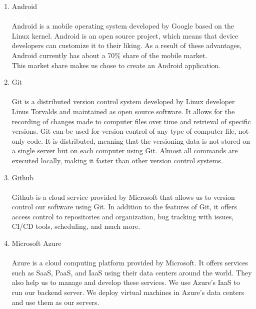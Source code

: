\begin{enumerate}[label=\arabic*]
\begin{enumerate}[label=\alph*.]
              \item Android\\
                    \\
                    Android is a mobile operating system developed by Google based on the Linux kernel. Android is an open source project, which means that device developers can customize it to their liking. As a result of these advantages, Android currently has about a 70\% share of the mobile market.
                    \cite{StatCounter}
                    \\
                    This market share makes us chose to create an Android application.\\

              \item Git\\
                    \\
                    Git is a distributed version control system developed by Linux developer Linus Torvalds and maintained as open source software. It allows for the recording of changes made to computer files over time and retrieval of specific versions. Git can be used for version control of any type of computer file, not only code. It is distributed, meaning that the versioning data is not stored on a single server but on each computer using Git. Almost all commands are executed locally, making it faster than other version control systems. \\

              \item Github\\
                    \\
                    Github is a cloud service provided by Microsoft that allows us to version control our software using Git. In addition to the features of Git, it offers access control to repositories and organization, bug tracking with issues, CI/CD tools, scheduling, and much more.\\

              \item Microsoft Azure\\
                    \\
                    Azure is a cloud computing platform provided by Microsoft. It offers services such as SaaS, PaaS, and IaaS using their data centers around the world. They also help us to manage and develop these services. We use Azure's IaaS to run our backend server. We deploy virtual machines in Azure's data centers and use them as our servers.\\


\end{enumerate}
\end{enumerate}
